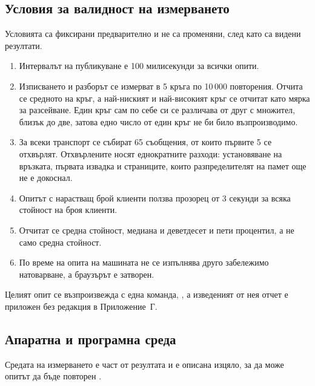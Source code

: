 \subsection{Условия за валидност на измерването}

Условията са фиксирани предварително и не са променяни, след като са видени резултати.

\begin{enumerate}[topsep=0pt,itemsep=0pt,leftmargin=*]
\item Интервалът на публикуване е 100 милисекунди за всички опити.
\item Изписването и разборът се измерват в 5 кръга по 10\,000 повторения. Отчита се
      средното на  кръг, а най-ниският и най-високият кръг се отчитат
      като мярка за разсейване. Един кръг сам по себе си се различава от друг с
      множител, близък до две, затова едно число от един кръг не би било възпроизводимо.
\item За всеки транспорт се събират 65 съобщения, от които първите 5 се отхвърлят.
      Отхвърлените носят еднократните разходи: установяване на връзката, първата извадка
      и страниците, които разпределителят на памет още не е докоснал.
\item Опитът с нарастващ брой клиенти ползва прозорец от 3 секунди за всяка стойност на
      броя клиенти.
\item Отчитат се средна стойност, медиана и деветдесет и пети процентил, а не само
      средна стойност.
\item По време на опита на машината не се изпълнява друго забележимо натоварване, а
      браузърът е затворен.
\end{enumerate}

Целият опит се възпроизвежда с една команда, , а изведеният от
нея отчет е приложен без редакция в Приложение~Г.

\subsection{Апаратна и програмна среда}

Средата на измерването е част от резултата и е описана изцяло, за да може опитът да бъде
повторен .

